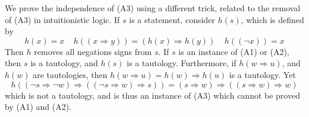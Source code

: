 We prove the independence of (A3) using a different trick, related to the removal of (A3) in intuitionistic logic. If $s$ is a statement, consider $h(s)$, which is defined by
%
\[ h(x) = x\ \ \ \ \ h((x \Rightarrow y)) = (h(x) \Rightarrow h(y))\ \ \ \ \ h((\neg x)) = x \]
%
Then $h$ removes all negations signs from $s$. If $s$ is an instance of (A1) or (A2), then $s$ is a tautology, and $h(s)$ is a tautology. Furthermore, if $h(w \Rightarrow u)$, and $h(w)$ are tautologies, then $h(w \Rightarrow u) = h(w) \Rightarrow h(u)$ is a tautology. Yet
%
\[ h((\neg s \Rightarrow \neg w) \Rightarrow ((\neg s \Rightarrow w) \Rightarrow s)) = (s \Rightarrow w) \Rightarrow((s \Rightarrow w) \Rightarrow w) \]
%
which is not a tautology, and is thus an instance of (A3) which cannot be proved by (A1) and (A2).